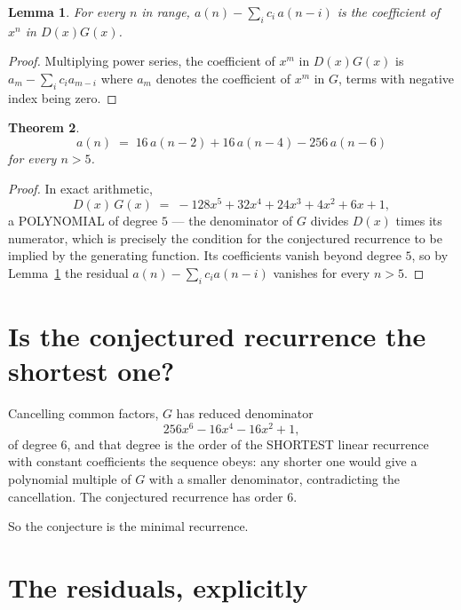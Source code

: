 \documentclass[11pt,a4paper]{article}
\theoremstyle{plain}
\newtheorem{theorem}{Theorem}
\newtheorem{lemma}[theorem]{Lemma}
\theoremstyle{definition}
\begin{document}
\begin{lemma}\label{lem:key}
For every $n$ in range, $a(n)-\sum_i c_i\,a(n-i)$ is the coefficient of $x^{n}$ in
$D(x)G(x)$.
\end{lemma}

\begin{proof}
Multiplying power series, the coefficient of $x^{m}$ in $D(x)G(x)$ is
$a_m-\sum_i c_i a_{m-i}$ where $a_m$ denotes the coefficient of $x^{m}$ in $G$, terms with
negative index being zero.
\end{proof}

\begin{theorem}
\[
a(n)\;=\;16\,a(n-2) + 16\,a(n-4) - 256\,a(n-6)
\]
for every $n>5$.
\end{theorem}

\begin{proof}
In exact arithmetic,
\[
D(x)\,G(x)\;=\;- 128 x^{5} + 32 x^{4} + 24 x^{3} + 4 x^{2} + 6 x + 1,
\]
a POLYNOMIAL of degree $5$ --- the denominator of $G$ divides $D(x)$ times its numerator,
which is precisely the condition for the conjectured recurrence to be implied by the
generating function. Its coefficients vanish beyond degree $5$, so by
Lemma~\ref{lem:key} the residual $a(n)-\sum_ic_ia(n-i)$ vanishes for every
$n>5$.
\end{proof}

\section{Is the conjectured recurrence the shortest one?}

Cancelling common factors, $G$ has reduced denominator
\[
256 x^{6} - 16 x^{4} - 16 x^{2} + 1,
\]
of degree $6$, and that degree is the order of the SHORTEST linear recurrence with
constant coefficients the sequence obeys: any shorter one would give a polynomial multiple of
$G$ with a smaller denominator, contradicting the cancellation. The conjectured recurrence has
order $6$.

So the conjecture is the minimal recurrence.

\section{The residuals, explicitly}
\end{document}
